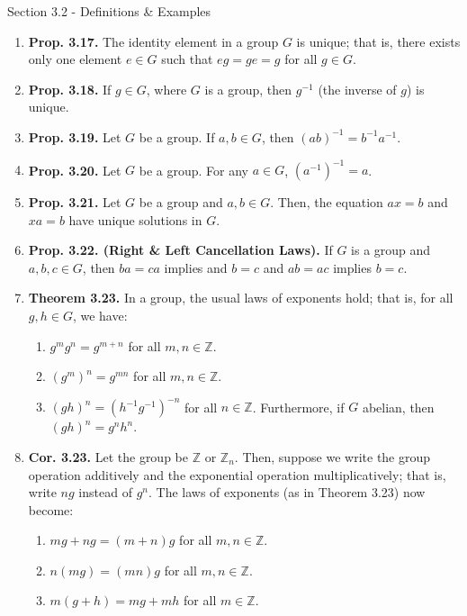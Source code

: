 \documentclass[12pt]{article}
\theoremstyle{definition}
\theoremstyle{named}
\begin{document}
\begin{section}{Section 3.2 - Definitions \& Examples}
    \begin{enumerate}
        \item \textbf{Prop. 3.17. } The identity element in a group $G$ is unique; that is, there exists only one element $e \in G$ such that $eg = ge = g$ for all $g \in G$. 
        \item \textbf{Prop. 3.18. } If $g \in G$, where $G$ is a group, then $g^{-1}$ (the inverse of $g$) is unique. 
        \item \textbf{Prop. 3.19. } Let $G$ be a group. If $a,b \in G$, then $(ab)^{-1} = b^{-1}a^{-1}$. 
        \item \textbf{Prop. 3.20. } Let $G$ be a group. For any $a \in G$, $(a^{-1})^{-1} = a$. 
        \item \textbf{Prop. 3.21. } Let $G$ be a group and $a,b \in G$. Then, the equation $ax=b$ and $xa=b$ have unique solutions in $G$. 
        \item \textbf{Prop. 3.22. (Right \& Left Cancellation Laws). } If $G$ is a group and $a,b,c \in G$, then $ba=ca$ implies and $b=c$ and $ab=ac$ implies $b=c$. 
        \item \textbf{Theorem 3.23. } In a group, the usual laws of exponents hold; that is, for all $g,h \in G$, we have: 
        \begin{enumerate}
            \item $g^mg^n = g^{m+n}$ for all $m,n \in \mathbb{Z}$. 
            \item $(g^m)^n = g^{mn}$ for all $m,n \in \mathbb{Z}$. 
            \item $(gh)^n = (h^{-1}g^{-1})^{-n}$ for all $n \in \mathbb{Z}$. Furthermore, if $G$ abelian, then $(gh)^n = g^nh^n$. 
        \end{enumerate}
        \item \textbf{Cor. 3.23. } Let the group be $\mathbb{Z}$ or $\mathbb{Z}_n$. Then, suppose we write the group operation additively and the exponential operation multiplicatively; that is, write $ng$ instead of $g^n$. The laws of exponents (as in Theorem 3.23) now become: 
        \begin{enumerate}
            \item $mg + ng = (m+n)g$ for all $m,n \in \mathbb{Z}$. 
            \item $n(mg) = (mn)g$ for all $m,n \in \mathbb{Z}$. 
            \item $m(g+h) = mg + mh$ for all $m \in \mathbb{Z}$. 
        \end{enumerate}
    \end{enumerate}
\end{section}
\end{document}
